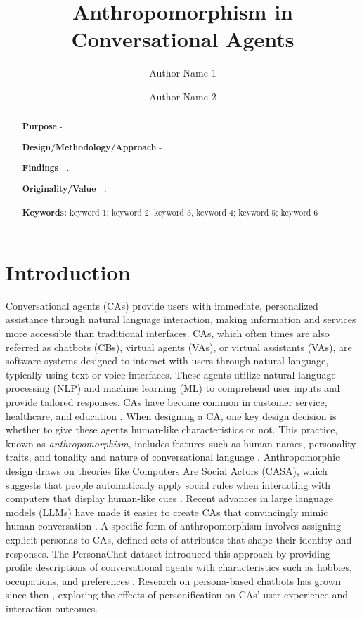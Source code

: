 \documentclass{article}
\author[1]{Author Name 1}
\author[2]{Author Name 2}
\affil[1]{Institute, Department, City, Country
email (corr. author)}
\affil[2]{Institute, Department, City, Country}
\title{Anthropomorphism in Conversational Agents }
\begin{document}
\maketitle


\begin{abstract}
\textbf{Purpose} - .

\textbf{Design/Methodology/Approach} - .

\textbf{Findings} - .

\textbf{Originality/Value} - . 
\\
\\
\textbf{Keywords:} keyword 1; keyword 2; keyword 3, keyword 4; keyword 5; keyword 6
\end{abstract}
\linenumbers


\section{Introduction}
\label{sec:introduction}
Conversational agents (CAs) provide users with immediate, personalized assistance through natural language interaction, making information and services more accessible than traditional interfaces. CAs, which often times are also referred as chatbots (CBs), virtual agents (VAs), or virtual assistants (VAs), are software systems designed to interact with users through natural language, typically using text or voice interfaces. These agents utilize natural language processing (NLP) and machine learning (ML) to comprehend user inputs and provide tailored responses. CAs have become common in customer service, healthcare, and education \citep{araujo2018living}. When designing a CA, one key design decision is whether to give these agents human-like characteristics or not. This practice, known as \textit{anthropomorphism}, includes features such as human names, personality traits, and tonality and nature of conversational language \citep{epley2007seeing}. Anthropomorphic design draws on theories like Computers Are Social Actors (CASA), which suggests that people automatically apply social rules when interacting with computers that display human-like cues \citep{nass1994computers,reeves1996media}. Recent advances in large language models (LLMs) have made it easier to create CAs that convincingly mimic human conversation \citep{pnas2025anthropomorphic}. A specific form of anthropomorphism involves assigning explicit personas to CAs, defined sets of attributes that shape their identity and responses. The PersonaChat dataset introduced this approach by providing profile descriptions of conversational agents with characteristics such as hobbies, occupations, and preferences \citep{zhang2018personalizing}. Research on persona-based chatbots has grown since then \citep{chen2024trends}, exploring the effects of personification on CAs' user experience and interaction outcomes.
\end{document}
